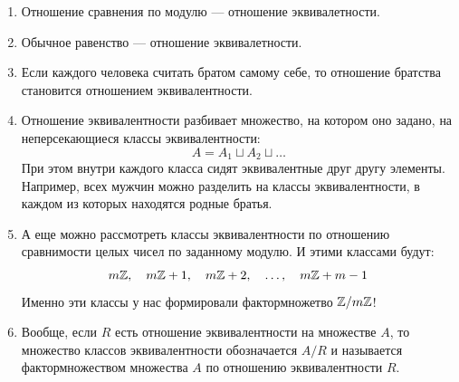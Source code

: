 \begin{enumerate}
\item Отношение сравнения по модулю --- отношение эквивалетности.
\item Обычное равенство --- отношение эквивалетности.
\item Если каждого человека считать братом самому себе, то отношение братства становится отношением эквивалентности.
\item Отношение эквивалентности разбивает множество, на котором оно задано, на неперсекающиеся классы эквивалентности:
$$
A = A_1\sqcup A_2\sqcup\dots
$$
При этом внутри каждого класса сидят эквивалентные друг другу элементы. Например, всех мужчин можно разделить на классы эквивалентности, в каждом из которых находятся родные братья.
\item А еще можно рассмотреть классы эквивалентности по отношению сравнимости целых чисел по заданному модулю. И этими классами будут:
$$
m\mathbb Z,\quad m\mathbb Z+1,\quad m\mathbb Z+2,\quad\dots,\quad m\mathbb Z+m-1
$$
Именно эти классы у нас формировали фактормножетво $\mathbb Z/m\mathbb Z$!
\item Вообще, если $R$ есть отношение эквивалентности на множестве $A$, то множество классов эквивалентности обозначается $A/R$ и называется фактормножеством множества $A$ по отношению эквивалентности $R$.
\end{enumerate}


